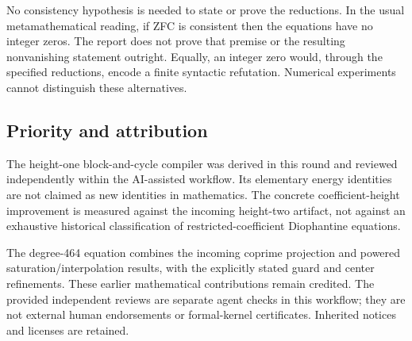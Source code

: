 No consistency hypothesis is needed to state or prove the reductions.
In the usual metamathematical reading, if ZFC is consistent then the
equations have no integer zeros. The report does not prove that premise
or the resulting nonvanishing statement outright. Equally, an integer
zero would, through the specified reductions, encode a finite syntactic
refutation. Numerical experiments cannot distinguish these alternatives.

\subsection{Priority and attribution}

The height-one block-and-cycle compiler was derived in this round and
reviewed independently within the AI-assisted workflow. Its elementary
energy identities are not claimed as new identities in mathematics.
The concrete coefficient-height improvement is measured against the
incoming height-two artifact, not against an exhaustive historical
classification of restricted-coefficient Diophantine equations.

The degree-464 equation combines the incoming coprime projection and
powered saturation/interpolation results, with the explicitly stated
guard and center refinements. These earlier mathematical contributions
remain credited. The provided independent reviews are separate agent
checks in this workflow; they are not external human endorsements or
formal-kernel certificates. Inherited notices and licenses are retained.
